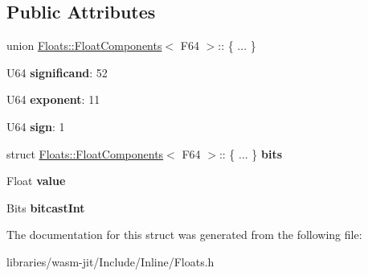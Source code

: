 \subsection*{Public Attributes}
\begin{DoxyCompactItemize}
\item 
\mbox{\label{struct_floats_1_1_float_components_3_01_f64_01_4_a95d5f83cbfd1fcf8593a4e88d1101660}} 
union \mbox{\hyperlink{struct_floats_1_1_float_components}{Floats\+::\+Float\+Components}}$<$ F64 $>$\+:: \{ ... \}  
\item 
\mbox{\label{struct_floats_1_1_float_components_3_01_f64_01_4_a7cb9ca463155603830dc75ef5060fdee}} 
U64 {\bfseries significand}\+: 52
\item 
\mbox{\label{struct_floats_1_1_float_components_3_01_f64_01_4_a194f4f72a216bfd87ff29c107010804c}} 
U64 {\bfseries exponent}\+: 11
\item 
\mbox{\label{struct_floats_1_1_float_components_3_01_f64_01_4_a5656836dc260377a1bee30b61c83bf30}} 
U64 {\bfseries sign}\+: 1
\item 
\mbox{\label{struct_floats_1_1_float_components_3_01_f64_01_4_afee7da0e1fc608f96b7a809a32f09545}} 
struct \mbox{\hyperlink{struct_floats_1_1_float_components}{Floats\+::\+Float\+Components}}$<$ F64 $>$\+:: \{ ... \}  {\bfseries bits}
\item 
\mbox{\label{struct_floats_1_1_float_components_3_01_f64_01_4_a2a95fe515c5eb602cae55690b250164b}} 
Float {\bfseries value}
\item 
\mbox{\label{struct_floats_1_1_float_components_3_01_f64_01_4_a11d593f64ee5b76a243222a609877baf}} 
Bits {\bfseries bitcast\+Int}
\end{DoxyCompactItemize}


The documentation for this struct was generated from the following file\+:\begin{DoxyCompactItemize}
\item 
libraries/wasm-\/jit/\+Include/\+Inline/Floats.\+h\end{DoxyCompactItemize}
